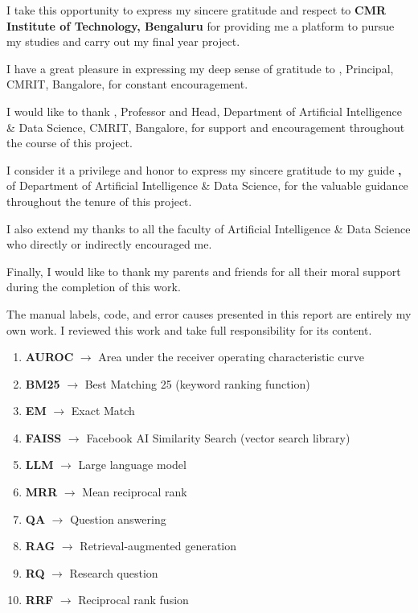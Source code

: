 {
I take this opportunity to express my sincere gratitude and respect to \textbf{CMR Institute of
Technology, Bengaluru} for providing me a platform to pursue my studies and carry out my final
year project.

I have a great pleasure in expressing my deep sense of gratitude to \textbf{\PrincipalName},
Principal, CMRIT, Bangalore, for constant encouragement.

I would like to thank \textbf{\HodName}, Professor and Head, Department of Artificial
Intelligence \& Data Science, CMRIT, Bangalore, for support and encouragement throughout the
course of this project.

I consider it a privilege and honor to express my sincere gratitude to my guide
\textbf{\GuideName, \GuideTitle} of Department of Artificial Intelligence \& Data Science, for
the valuable guidance throughout the tenure of this project.

I also extend my thanks to all the faculty of Artificial Intelligence \& Data Science who
directly or indirectly encouraged me.

Finally, I would like to thank my parents and friends for all their moral support during the
completion of this work.

The manual labels, code, and error causes presented in this report are entirely my own work.
I reviewed this work and take full responsibility for its content.\par}

\thesiscontents
\thesisfigures
\thesistables

\begin{enumerate}[label=\textbf{\arabic*.},itemsep=0.3em]
\item \textbf{AUROC} $\rightarrow$ Area under the receiver operating characteristic curve
\item \textbf{BM25} $\rightarrow$ Best Matching 25 (keyword ranking function)
\item \textbf{EM} $\rightarrow$ Exact Match
\item \textbf{FAISS} $\rightarrow$ Facebook AI Similarity Search (vector search library)
\item \textbf{LLM} $\rightarrow$ Large language model
\item \textbf{MRR} $\rightarrow$ Mean reciprocal rank
\item \textbf{QA} $\rightarrow$ Question answering
\item \textbf{RAG} $\rightarrow$ Retrieval-augmented generation
\item \textbf{RQ} $\rightarrow$ Research question
\item \textbf{RRF} $\rightarrow$ Reciprocal rank fusion
\end{enumerate}
